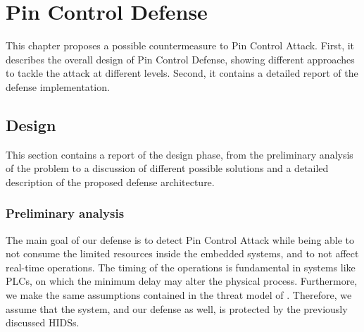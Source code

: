 \chapter{Pin Control Defense}
\label{chap:defense}

This chapter proposes a possible countermeasure to Pin Control Attack.
First, it describes the overall design of Pin Control Defense, showing different approaches to tackle the attack at different levels.
Second, it contains a detailed report of the defense implementation.


\section{Design}
This section contains a report of the design phase, from the preliminary analysis of the problem to a discussion of different possible solutions
and a detailed description of the proposed defense architecture.


\subsection{Preliminary analysis}
\label{sec:pre_analysis}

The main goal of our defense is to detect Pin Control Attack while being able to not consume the limited resources inside the embedded systems,
and to not affect real-time operations. The timing of the operations is fundamental in systems like PLCs, on which the minimum delay may alter the physical process.
Furthermore, we make the same assumptions contained in the threat model of .
Therefore, we assume that the system, and our defense as well, is protected by the previously discussed HIDSs.

